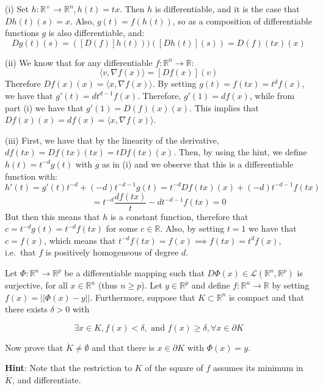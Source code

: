 \begin{solution}

    (i) Set $h: \mathbb{R}^{+} \rightarrow \mathbb{R}^n, h(t) = tx$.
    Then $h$ is differentiable, and it is the case that $Dh(t)(s) = x$.
    Also, $g(t) = f(h(t))$, so as a composition of differentiable functions $g$ is also differentiable, and:
    $$Dg(t)(s) = ([D(f)]h(t)))([Dh(t)](s)) = D(f)(tx)(x)$$

    (ii) We know that for any differentiable $f: \mathbb{R}^n \rightarrow \mathbb{R}$:
    $$\langle v, \nabla f(x) \rangle = [D f(x)](v)$$
    Therefore $Df(x)(x) = \langle x, \nabla f(x) \rangle$.
    By setting $g(t) = f(tx) = t^df(x)$, we have that $g'(t) = dt^{d-1}f(x)$.
    Therefore, $g'(1) = df(x)$, while from part (i) we have that $g'(1) =  D(f)(x)(x)$.
    This implies that $Df(x)(x) = d f(x) = \langle x, \nabla f(x) \rangle$.

    (iii) First, we have that by the linearity of the derivative, $df(tx) = Df(tx)(tx) = t Df(tx)(x)$.
    Then, by using the hint, we define $h(t) = t^{-d}g(t)$ with $g$ as in (i) and we observe that this is a differentiable function with:
    $$h'(t) = g'(t)t^{-d} + (-d)t^{-d-1}g(t) = t^{-d}Df(tx)(x) + (-d)t^{-d-1}f(tx)$$
    $$ = t^{-d}\frac{df(tx)}{t} - dt^{-d-1}f(tx) = 0$$
    But then this means that $h$ is a constant function, therefore that $c = t^{-d}g(t) = t^{-d}f(tx)$ for some $c \in \mathbb{R}$. 
    Also, by setting $t = 1$ we have that $c = f(x)$, which means that $t^{-d}f(tx) = f(x) \implies f(tx) = t^{d}f(x)$, i.e.\ that $f$ is positively homogeneous of degree $d$.
    
\end{solution}

\newpage

\begin{exercise}{37}
    Let $\Phi: \mathbb{R}^n \rightarrow \mathbb{R}^p$ be a differentiable mapping such that $D \Phi(x) \in \mathcal{L}(\mathbb{R}^n, \mathbb{R}^p)$ is surjective, for all $x \in \mathbb{R}^n$ (thus $n \geq p$).
    Let $y \in \mathbb{R}^p$ and define $f: \mathbb{R}^n \rightarrow \mathbb{R}$ by setting $f(x) = \lvert \lvert \Phi(x) - y \rvert \rvert$.
    Furthermore, suppose that $K \subset \mathbb{R}^n$ is compact and that there exists $\delta > 0$ with

    \[\exists x \in K, f(x) < \delta, \text{ and } f(x) \geq \delta, \forall x \in \partial K\]

    Now prove that $\mathring{K} \neq \emptyset$ and that there is $x \in \partial K$ with $\Phi(x) = y$.

    \textbf{Hint}: Note that the restriction to $K$ of the square of $f$ assumes its minimum in $\mathring{K}$, and differentiate.
\end{exercise}


